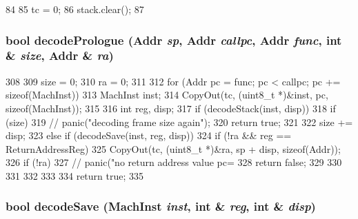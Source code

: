 \begin{DoxyCode}
84     {
85         tc = 0;
86         stack.clear();
87     }
\end{DoxyCode}
\hypertarget{classAlphaISA_1_1StackTrace_a875eea16b2891accc8cbec7eb6c36003}{
\subsubsection[{decodePrologue}]{\setlength{\rightskip}{0pt plus 5cm}bool decodePrologue ({\bf Addr} {\em sp}, \/  {\bf Addr} {\em callpc}, \/  {\bf Addr} {\em func}, \/  int \& {\em size}, \/  {\bf Addr} \& {\em ra})}}
\label{classAlphaISA_1_1StackTrace_a875eea16b2891accc8cbec7eb6c36003}



\begin{DoxyCode}
308 {
309     size = 0;
310     ra = 0;
311 
312     for (Addr pc = func; pc < callpc; pc += sizeof(MachInst)) {
313         MachInst inst;
314         CopyOut(tc, (uint8_t *)&inst, pc, sizeof(MachInst));
315 
316         int reg, disp;
317         if (decodeStack(inst, disp)) {
318             if (size) {
319                 // panic("decoding frame size again");
320                 return true;
321             }
322             size += disp;
323         } else if (decodeSave(inst, reg, disp)) {
324             if (!ra && reg == ReturnAddressReg) {
325                 CopyOut(tc, (uint8_t *)&ra, sp + disp, sizeof(Addr));
326                 if (!ra) {
327                     // panic("no return address value pc=%
328                     return false;
329                 }
330             }
331         }
332     }
333 
334     return true;
335 }
\end{DoxyCode}
\hypertarget{classAlphaISA_1_1StackTrace_ae56dad5982b67d8717714c383b6a59f8}{
\subsubsection[{decodeSave}]{\setlength{\rightskip}{0pt plus 5cm}bool decodeSave ({\bf MachInst} {\em inst}, \/  int \& {\em reg}, \/  int \& {\em disp})}}
\label{classAlphaISA_1_1StackTrace_ae56dad5982b67d8717714c383b6a59f8}



